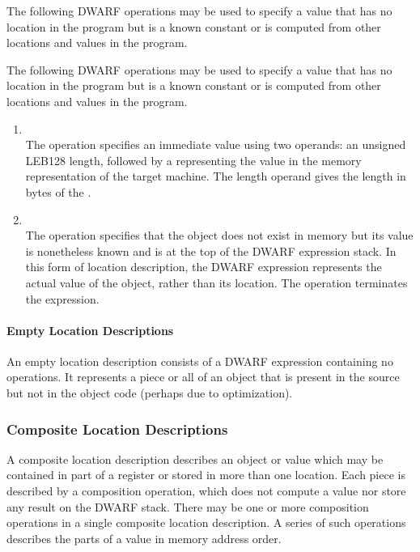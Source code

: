 The following DWARF operations may be used to specify a value
that has no location in the program but is a known constant
or is computed from other locations and values in the program.

The following DWARF operations may be used to specify a value
that has no location in the program but is a known constant
or is computed from other locations and values in the program.

\begin{enumerate}[1]
\item {} \\
The  operation specifies an immediate value
using two operands: an unsigned LEB128 length, followed by
a  representing the value in the memory representation
of the target machine. The length operand gives the length
in bytes of the .

\item {} \\
The  operation specifies that the object
does not exist in memory but its value is nonetheless known
and is at the top of the DWARF expression stack. In this form
of location description, the DWARF expression represents the
actual value of the object, rather than its location. The
 operation terminates the expression.
\end{enumerate}


\paragraph{Empty Location Descriptions}

An empty location description consists of a DWARF expression
containing no operations. It represents a piece or all of an
object that is present in the source but not in the object code
(perhaps due to optimization).

\subsubsection{Composite Location Descriptions}
A composite location description describes an object or
value which may be contained in part of a register or stored
in more than one location. Each piece is described by a
composition operation, which does not compute a value nor
store any result on the DWARF stack. There may be one or
more composition operations in a single composite location
description. A series of such operations describes the parts
of a value in memory address order.

